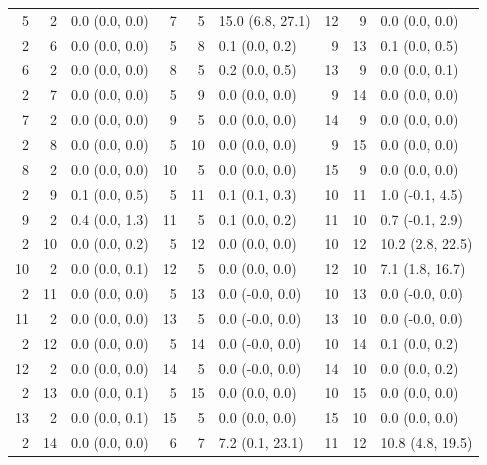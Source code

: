 \begin{table}
\begin{tabular}{|rrl||rrl||rrl|}
       5 &    2 &    0.0 (0.0, 0.0) &    7 &    5 &   15.0 (6.8, 27.1) &   12 &    9 &      0.0 (0.0, 0.0) \\
       2 &    6 &    0.0 (0.0, 0.0) &    5 &    8 &     0.1 (0.0, 0.2) &    9 &   13 &      0.1 (0.0, 0.5) \\
       6 &    2 &    0.0 (0.0, 0.0) &    8 &    5 &     0.2 (0.0, 0.5) &   13 &    9 &      0.0 (0.0, 0.1) \\
       2 &    7 &    0.0 (0.0, 0.0) &    5 &    9 &     0.0 (0.0, 0.0) &    9 &   14 &      0.0 (0.0, 0.0) \\
       7 &    2 &    0.0 (0.0, 0.0) &    9 &    5 &     0.0 (0.0, 0.0) &   14 &    9 &      0.0 (0.0, 0.0) \\
       2 &    8 &    0.0 (0.0, 0.0) &    5 &   10 &     0.0 (0.0, 0.0) &    9 &   15 &      0.0 (0.0, 0.0) \\
       8 &    2 &    0.0 (0.0, 0.0) &   10 &    5 &     0.0 (0.0, 0.0) &   15 &    9 &      0.0 (0.0, 0.0) \\
       2 &    9 &    0.1 (0.0, 0.5) &    5 &   11 &     0.1 (0.1, 0.3) &   10 &   11 &     1.0 (-0.1, 4.5) \\
       9 &    2 &    0.4 (0.0, 1.3) &   11 &    5 &     0.1 (0.0, 0.2) &   11 &   10 &     0.7 (-0.1, 2.9) \\
       2 &   10 &    0.0 (0.0, 0.2) &    5 &   12 &     0.0 (0.0, 0.0) &   10 &   12 &    10.2 (2.8, 22.5) \\
      10 &    2 &    0.0 (0.0, 0.1) &   12 &    5 &     0.0 (0.0, 0.0) &   12 &   10 &     7.1 (1.8, 16.7) \\
       2 &   11 &    0.0 (0.0, 0.0) &    5 &   13 &    0.0 (-0.0, 0.0) &   10 &   13 &     0.0 (-0.0, 0.0) \\
      11 &    2 &    0.0 (0.0, 0.0) &   13 &    5 &    0.0 (-0.0, 0.0) &   13 &   10 &     0.0 (-0.0, 0.0) \\
       2 &   12 &    0.0 (0.0, 0.0) &    5 &   14 &    0.0 (-0.0, 0.0) &   10 &   14 &      0.1 (0.0, 0.2) \\
      12 &    2 &    0.0 (0.0, 0.0) &   14 &    5 &    0.0 (-0.0, 0.0) &   14 &   10 &      0.0 (0.0, 0.2) \\
       2 &   13 &    0.0 (0.0, 0.1) &    5 &   15 &     0.0 (0.0, 0.0) &   10 &   15 &      0.0 (0.0, 0.0) \\
      13 &    2 &    0.0 (0.0, 0.1) &   15 &    5 &     0.0 (0.0, 0.0) &   15 &   10 &      0.0 (0.0, 0.0) \\
       2 &   14 &    0.0 (0.0, 0.0) &    6 &    7 &    7.2 (0.1, 23.1) &   11 &   12 &    10.8 (4.8, 19.5) \\

\end{tabular}
\end{table}
